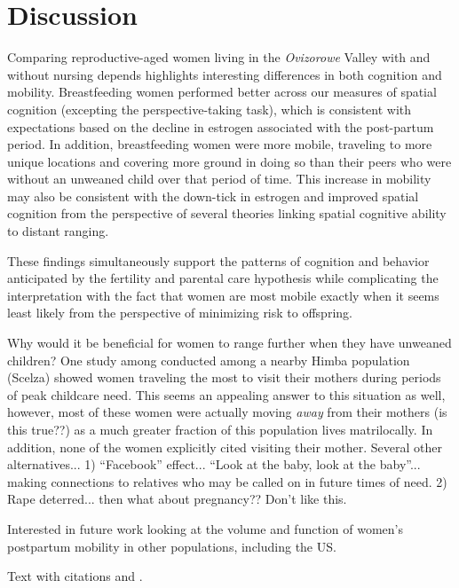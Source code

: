 \section{Discussion}
\label{sec:4}
Comparing reproductive-aged women living in the \emph{Ovizorowe} Valley with and without nursing depends highlights interesting differences in both cognition and mobility.  Breastfeeding women performed better across our measures of spatial cognition (excepting the perspective-taking task), which is consistent with expectations based on the decline in estrogen associated with the post-partum period.  In addition, breastfeeding women were more mobile, traveling to more unique locations and covering more ground in doing so than their peers who were without an unweaned child over that period of time.  This increase in mobility may also be consistent with the down-tick in estrogen and improved spatial cognition from the perspective of several theories linking spatial cognitive ability to distant ranging.  

These findings simultaneously support the patterns of cognition and behavior anticipated by the fertility and parental care hypothesis while complicating the interpretation with the fact that women are most mobile exactly when it seems least likely from the perspective of minimizing risk to offspring.

Why would it be beneficial for women to range further when they have unweaned children?  One study among conducted among a nearby  Himba population (Scelza) showed women traveling the most to visit their mothers during periods of peak childcare need.  This seems an appealing answer to this situation as well, however, most of these women were actually moving \emph{away} from their mothers (is this true??) as a much greater fraction of this population lives matrilocally.  In addition, none of the women explicitly cited visiting their mother.  Several other alternatives... 1) ``Facebook'' effect...  ``Look at the baby, look at the baby''... making connections to relatives who may be called on in future times of need.  2) Rape deterred... then what about pregnancy??  Don't like this.

Interested in future work looking at the volume and function of women's postpartum mobility in other populations, including the US.


Text with citations \cite{RefB} and \cite{RefJ}.




